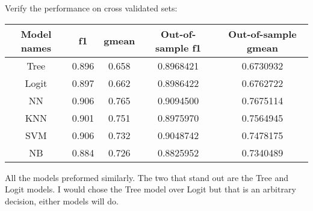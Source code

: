 \documentclass{article}
\begin{document}
Verify the performance on cross validated sets:\\
\begin{center}
 \begin{tabular}{||c c c c c ||} 
 
 \hline
 Model names & f1 & gmean & Out-of-sample f1 & Out-of-sample gmean\\ [0.5ex] 
 
 \hline\hline
 Tree & 0.896 & 0.658 & 0.8968421 & 0.6730932  \\ 
 \hline
 Logit & 0.897 & 0.662 &  0.8986422 &  0.6762722\\
 \hline
 NN & 0.906 & 0.765 & 0.9094500 & 0.7675114 \\
 \hline
 KNN & 0.901 & 0.751 & 0.8975970  & 0.7564945 \\
 \hline
 SVM & 0.906 & 0.732 & 0.9048742 & 0.7478175 \\
 \hline
 NB & 0.884 & 0.726 & 0.8825952 & 0.7340489\\[1ex] 
 
 
 \hline
\end{tabular}
\end{center}


All the models preformed similarly. The two that stand out are the Tree and Logit models. I would chose the Tree model over Logit but that is an arbitrary decision, either models will do.  
\end{document}
